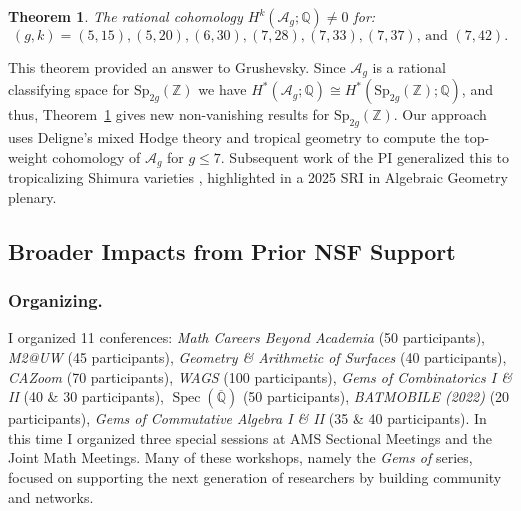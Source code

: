 \documentclass[11pt,reqno]{amsart}
\newtheorem{theorem}[lemma]{Theorem}
\theoremstyle{remark}
\newcommand{\Spec}{\operatorname{Spec}}
\newcommand{\QQ}{\mathbb{Q}}
\newcommand{\ZZ}{\mathbb{Z}}
\newcommand{\cA}{\mathcal{A}}
\begin{document}
\begin{theorem}\cite[Theorem A]{BBCMMW24}\label{thm:Ag}
The rational cohomology $H^{k}\left(\cA_{g};\QQ\right)\neq0$ for:
\[
\text{$(g,k)=(5,15),(5,20),(6,30),(7,28),(7,33),(7,37)$, and $(7,42)$}.
\]
\end{theorem}

This theorem provided an answer to Grushevsky. Since $\cA_g$ is a rational classifying space for $\mathrm{Sp}_{2g}(\ZZ)$ we have $H^*(\cA_g;\QQ) \cong H^*(\mathrm{Sp}_{2g}(\ZZ);\QQ)$, and thus, Theorem~\ref{thm:Ag} gives new non-vanishing results for $\mathrm{Sp}_{2g}(\ZZ)$. Our approach uses Deligne’s mixed Hodge theory and tropical geometry to compute the top-weight cohomology of $\cA_g$ for $g\leq 7$. Subsequent work of the PI generalized this to tropicalizing Shimura varieties \cite{ABBCV25}, highlighted in a 2025 SRI in Algebraic Geometry plenary. 


 
\subsection{Broader Impacts from Prior NSF Support}

\subsubsection{Organizing.}\label{subsubsec:prior-organizing} I organized 11 conferences: \textit{Math Careers Beyond Academia } (50 participants), \textit{M2@UW} (45 participants), \textit{Geometry \& Arithmetic of Surfaces} (40 participants), \textit{CAZoom} (70 participants), \textit{WAGS} (100 participants), \textit{Gems of Combinatorics I \& II} (40 \& 30 participants), $\Spec(\overline{\QQ})$ (50 participants), \textit{BATMOBILE (2022)} (20 participants),  \textit{Gems of Commutative Algebra I \& II} (35 \& 40 participants). In this time I organized three special sessions at AMS Sectional Meetings and the Joint Math Meetings. Many of these workshops, namely the \textit{Gems of} series, focused on supporting  the next generation of researchers by building community and networks.
\end{document}
